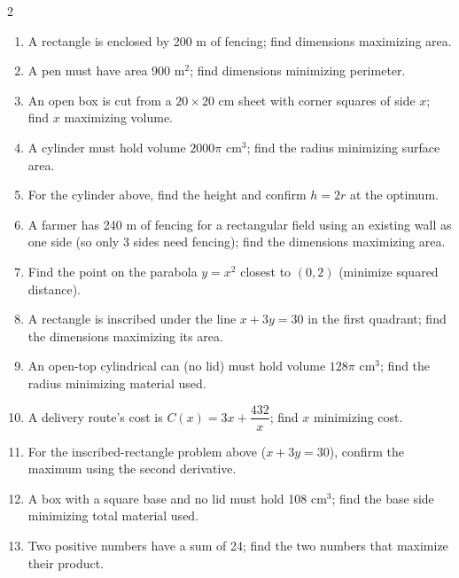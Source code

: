 \documentclass[11pt]{article}
\begin{document}
\begin{recapbox}
\begin{multicols}{2}
\small
\begin{enumerate}[leftmargin=*,itemsep=3pt]
  \item A rectangle is enclosed by 200 m of fencing; find dimensions maximizing area.
  \item A pen must have area 900 m$^2$; find dimensions minimizing perimeter.
  \item An open box is cut from a $20\times20$ cm sheet with corner squares of side $x$; find $x$ maximizing volume.
  \item A cylinder must hold volume $2000\pi$ cm$^3$; find the radius minimizing surface area.
  \item For the cylinder above, find the height and confirm $h=2r$ at the optimum.
  \item A farmer has 240 m of fencing for a rectangular field using an existing wall as one side (so only 3 sides need fencing); find the dimensions maximizing area.
  \item Find the point on the parabola $y=x^2$ closest to $(0,2)$ (minimize squared distance).
  \item A rectangle is inscribed under the line $x+3y=30$ in the first quadrant; find the dimensions maximizing its area.
  \item An open-top cylindrical can (no lid) must hold volume $128\pi$ cm$^3$; find the radius minimizing material used.
  \item A delivery route's cost is $C(x)=3x+\dfrac{432}x$; find $x$ minimizing cost.
  \item For the inscribed-rectangle problem above ($x+3y=30$), confirm the maximum using the second derivative.
  \item A box with a square base and no lid must hold 108 cm$^3$; find the base side minimizing total material used.
  \item Two positive numbers have a sum of 24; find the two numbers that maximize their product.
\end{enumerate}
\end{multicols}
\end{recapbox}
\end{document}
